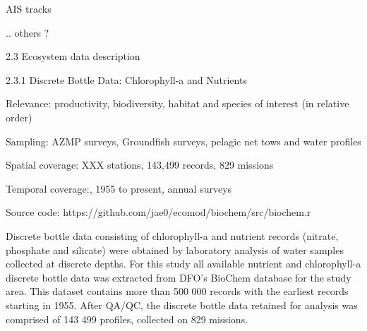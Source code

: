 \documentclass[letterpaper,portrait,12pt]{scrartcl}
\numberwithin{equation}{section}		%
\numberwithin{figure}{section}			%
\numberwithin{table}{section}				%
\begin{document}
\begin{flushleft}

	AIS tracks

\end{flushleft}


\begin{flushleft}

	..  others ?

\end{flushleft}













2.3  Ecosystem data description









2.3.1 Discrete Bottle Data: Chlorophyll-a and Nutrients









Relevance:  productivity, biodiversity, habitat and species of interest (in relative order)




Sampling:  AZMP surveys, Groundfish surveys, pelagic net tows and water profiles




Spatial coverage: XXX stations, 143,499 records, 829 missions




Temporal coverage:,  1955 to present, annual surveys




Source code: https://github.com/jae0/ecomod/biochem/src/biochem.r









Discrete bottle data consisting of chlorophyll-a and nutrient records (nitrate, phosphate and silicate) were obtained by laboratory analysis of water samples collected at discrete depths. For this study all available nutrient and chlorophyll-a discrete bottle data was extracted from DFO's BioChem database for the study area. This dataset contains more than 500 000 records with the earliest records starting in 1955. After QA/QC, the discrete bottle data retained for analysis was comprised of 143 499 profiles, collected on 829 missions.
\end{document}
